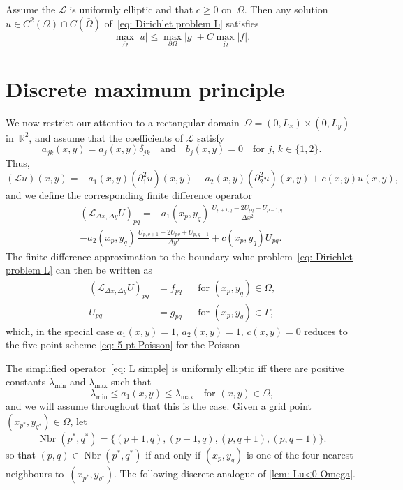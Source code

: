 \begin{theorem}\label{thm: a priori elliptic}
Assume the $\mathcal{L}$ is uniformly elliptic and that $c\ge0$ on~$\Omega$.
Then any solution $u\in C^2(\Omega)\cap C(\overline{\Omega})$ 
of~\eqref{eq: Dirichlet problem L} satisfies
\[
\max_{\overline{\Omega}}|u|\le\max_{\partial\Omega}|g|
	+C\max_{\overline{\Omega}}|f|.
\]
\end{theorem}

\section{Discrete maximum principle}
We now restrict our attention to a rectangular 
domain~$\Omega=(0,L_x)\times(0,L_y)$ in~$\mathbb{R}^2$, and assume that the
coefficients of $\mathcal{L}$ satisfy
\[
a_{jk}(x,y)=a_j(x,y)\delta_{jk}\quad\text{and}\quad
b_j(x,y)=0\quad\text{for $j$, $k\in\{1,2\}$.}
\]
Thus,
\begin{equation}\label{eq: L simple}
(\mathcal{L}u)(x,y)=-a_1(x,y)(\partial_1^2u)(x,y)
	-a_2(x,y)(\partial_2^2u)(x,y)+c(x,y)u(x,y),
\end{equation}
and we define the corresponding finite difference operator 
\begin{multline*}
(\mathcal{L}_{\Delta x,\Delta y}U)_{pq}=-a_1(x_p,y_q)\,
	\frac{U_{p+1,q}-2U_{pq}+U_{p-1,q}}{\Delta x^2}\\
	-a_2(x_p,y_q)\,
	\frac{U_{p,q+1}-2U_{pq}+U_{p,q-1}}{\Delta y^2}
	+c(x_p,y_q)U_{pq}.
\end{multline*}
The finite difference approximation to the boundary-value 
problem~\eqref{eq: Dirichlet problem L} can then be written as
\begin{equation}\label{eq: discrete bvp 2d}
\begin{aligned}
(\mathcal{L}_{\Delta x,\Delta y}U)_{pq}&=f_{pq}&&
\text{for $(x_p,y_q)\in\Omega$,}\\
U_{pq}&=g_{pq}&&\text{for $(x_p,y_q)\in\Gamma$,}
\end{aligned}
\end{equation}
which, in the special case $a_1(x,y)=1$, $a_2(x,y)=1$, $c(x,y)=0$
reduces to the five-point scheme \eqref{eq: 5-pt Poisson} for the Poisson

The simplified operator~\eqref{eq: L simple} is uniformly elliptic iff
there are positive constants $\lambda_{\min}$ and $\lambda_{\max}$ such that
\[
\lambda_{\min}\le a_1(x,y)\le\lambda_{\max}\quad\text{for $(x,y)\in\Omega$,}
\]
and we will assume throughout that this is the case.  Given a grid 
point~$(x_{p^*},y_{q^*})\in\Omega$, let
\[
\operatorname{Nbr}(p^*,q^*)=\{(p+1,q),(p-1,q),(p,q+1),(p,q-1)\}.
\]
so that $(p,q)\in\operatorname{Nbr}(p^*,q^*)$ if and only if $(x_p,y_q)$ is 
one of the four nearest neighbours to~$(x_{p^*},y_{q^*})$.  The following 
discrete analogue of \cref{lem: Lu<0 Omega}.

